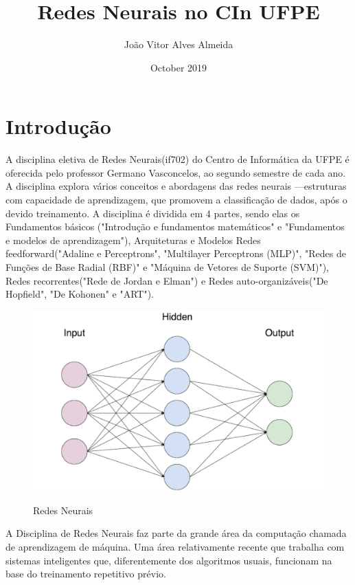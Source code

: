 \documentclass{article}
\title{Redes Neurais no CIn UFPE}
\author{João Vitor Alves Almeida }
\date{October 2019}
\begin{document}
\maketitle

\section{Introdução}
A disciplina eletiva de Redes Neurais(if702)\citep{Disciplina} do Centro de Informática da UFPE é oferecida pelo professor Germano Vasconcelos\citep{GCV}, ao segundo semestre de cada ano. A disciplina explora vários conceitos e abordagens das redes neurais —estruturas com capacidade de aprendizagem, que promovem a classificação de dados, após o devido treinamento. A disciplina é dividida em 4 partes, sendo elas os Fundamentos básicos ("Introdução e fundamentos matemáticos" e "Fundamentos e modelos de aprendizagem"), Arquiteturas e Modelos Redes feedforward("Adaline e Perceptrons", "Multilayer Perceptrons (MLP)", "Redes de Funções de Base Radial (RBF)" e "Máquina de Vetores de Suporte (SVM)"), Redes recorrentes("Rede de Jordan e Elman") e Redes auto-organizáveis("De Hopfield", "De Kohonen" e "ART")\citep{CInWiki}. \\

\begin{figure}[h!]
\centering
\includegraphics[scale=0.2]{redes-1.png}
\caption{Redes Neurais}
\label{fig:redes-1}
\citep{RedesNeurais}
\end{figure}



{
A Disciplina de Redes Neurais faz parte da grande área da computação chamada de aprendizagem de máquina. Uma área relativamente recente que trabalha com sistemas inteligentes que, diferentemente dos algoritmos usuais, funcionam na base do treinamento repetitivo prévio.    
}
\end{document}
